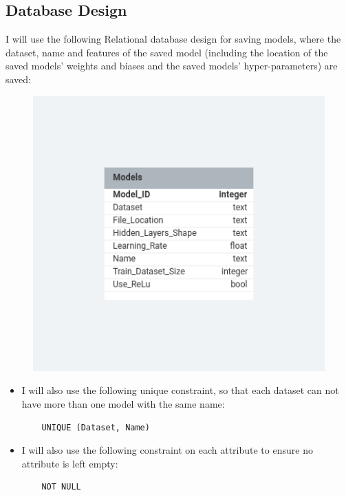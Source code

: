 \documentclass[./project-report/src/latex/project-report.tex]{subfiles}
\begin{document}
\pagebreak

\subsection{Database Design}

I will use the following Relational database design for saving models, where the dataset, name and features of the saved model (including the location of the 
saved models' weights and biases and the saved models' hyper-parameters) are saved:

\begin{figure}[h!]
\centering
\includegraphics[width=1\textwidth]{./project-report/src/images/database-design.png}
\end{figure}

\begin{itemize}
    \item I will also use the following unique constraint, so that each dataset can not have more than one model with the same name:
    \begin{verbatim}
    UNIQUE (Dataset, Name)
    \end{verbatim}
    \item I will also use the following constraint on each attribute to ensure no attribute is left empty:
    \begin{verbatim}
    NOT NULL
    \end{verbatim}
\end{itemize}
\end{document}
